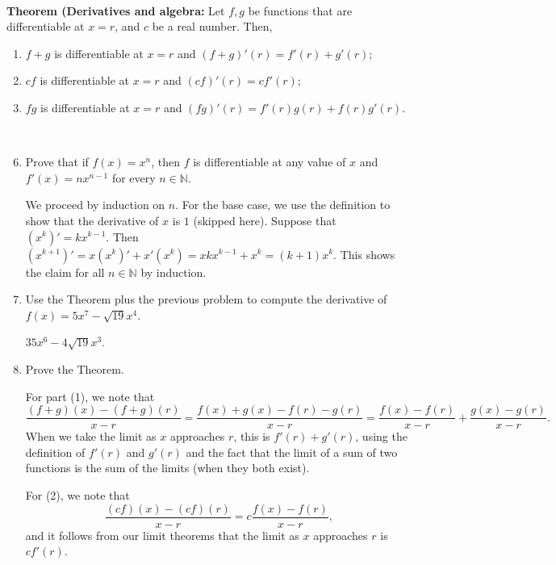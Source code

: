 \documentclass[12pt]{amsart}
\newcommand{\N}{\mathbb{N}}
\numberwithin{equation}{section}
\theoremstyle{plain} %
\theoremstyle{definition}
\theoremstyle{remark}
\begin{document}
 \
 
 

 \noindent \textbf{Theorem (Derivatives and algebra:} Let $f,g$ be functions that are differentiable at $x=r$, and $c$ be a real number. Then,
 \begin{enumerate}
 \item $f+g$ is differentiable at $x=r$ and $(f+g)'(r) = f'(r) + g'(r)$;
 \item $cf$ is differentiable at $x=r$ and $(cf)'(r) = c f'(r)$;
 \item $fg$ is differentiable at $x=r$ and $(fg)'(r) = f'(r) g(r) + f(r) g'(r)$.
   \end{enumerate}

 
 \
 
 \begin{enumerate}\setcounter{enumi}{5}
 \item Prove that if $f(x)=x^n$, then $f$ is differentiable at any value of $x$ and $f'(x) = n x^{n-1}$ for every $n\in \N$.
 
  \begin{framed}
  We proceed by induction on $n$.
For the base case, we use the definition to show that the derivative of $x$ is $1$ (skipped here). 
Suppose that $(x^k)' = k x^{k-1}$. Then $(x^{k+1})' = x (x^k)' + x' (x^k) = x kx^{k-1} + x^k = (k+1) x^k$. This shows the claim for all $n\in \N$ by induction.
\end{framed}
  
 \item Use the Theorem plus the previous problem to compute the derivative of $f(x) = 5x^7 - \sqrt{19} x^4$.
 
  \begin{framed}
  $35 x^6 - 4 \sqrt{19} x^3$.
  \end{framed}
 
 \item Prove the Theorem.
 
 \begin{framed}
 For part (1), we note that \[ \frac{(f+g)(x) - (f+g)(r)}{x-r} = \frac{f(x) + g(x) - f(r) - g(r)}{x-r} = \frac{f(x)-f(r)}{x-r} + \frac{g(x) - g(r)}{x-r}.\] When we take the limit as $x$ approaches $r$, this is $f'(r) + g'(r)$, using the definition of $f'(r)$ and $g'(r)$ and the fact that the limit of a sum of two functions is the sum of the limits (when they both exist).

For (2),   we note that \[ \frac{(cf)(x) - (cf)(r)}{x-r} = c \frac{f(x) - f(r)}{x-r},\] and it follows from our limit theorems that the limit as $x$ approaches $r$ is $cf'(r)$.



\end{framed}
\end{enumerate}
\end{document}
